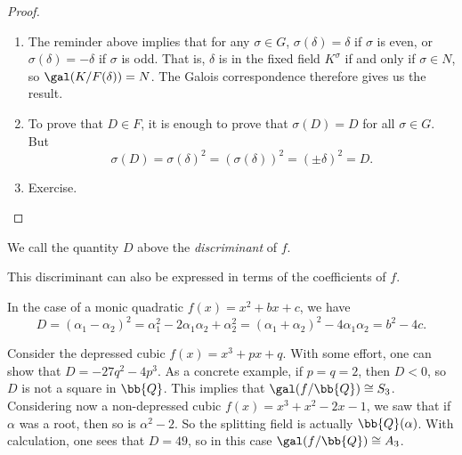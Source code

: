 \begin{proof}~
    \begin{enumerate}[label=(\alph*)]
        \item The reminder above implies that for any $\sigma \in G$, $\sigma(\delta) = \delta$ if $\sigma$ is even, or $\sigma(\delta) = -\delta$ if $\sigma$ is odd. That is, $\delta$ is in the fixed field $K^\sigma$ if and only if $\sigma \in N$, so $\gal(K/F(\delta)) = N$. The Galois correspondence therefore gives us the result.
        \item To prove that $D \in F$, it is enough to prove that $\sigma(D) = D$ for all $\sigma \in G$. But
        \[
            \sigma(D) = \sigma(\delta)^2 = (\sigma(\delta))^2 = (\pm \delta)^2 = D.
        \]
        \item Exercise. \qedhere
    \end{enumerate}
\end{proof}

\begin{definition}
    We call the quantity $D$ above the \emph{discriminant} of $f$.
\end{definition}

This discriminant can also be expressed in terms of the coefficients of $f$.

\begin{example}
    In the case of a monic quadratic $f(x) = x^2 + bx + c$, we have
    \[
        D = (\alpha_1 - \alpha_2)^2 = \alpha_1^2 - 2\alpha_1 \alpha_2 + \alpha_2^2 = (\alpha_1 + \alpha_2)^2 - 4 \alpha_1 \alpha_2 = b^2 - 4c.
    \]
\end{example}

\begin{example}
    Consider the depressed cubic $f(x) = x^3 + px + q$. With some effort, one can show that $D = -27q^2 - 4p^3$. As a concrete example, if $p = q = 2$, then $D < 0$, so $D$ is not a square in $\bb{Q}$. This implies that $\gal(f/\bb{Q}) \cong S_3$. Considering now a non-depressed cubic $f(x) = x^3 + x^2 - 2x - 1$, we saw that if $\alpha$ was a root, then so is $\alpha^2 - 2$. So the splitting field is actually $\bb{Q}(\alpha)$. With calculation, one sees that $D = 49$, so in this case $\gal(f/\bb{Q}) \cong A_3$.
\end{example}
